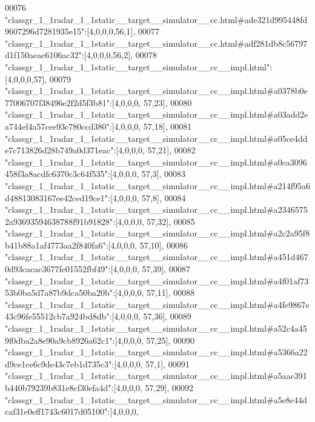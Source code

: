 \begin{DoxyCode}
00076 \textcolor{stringliteral}{"classgr\_1\_1radar\_1\_1static\_\_target\_\_simulator\_\_cc.html#ade321d995448fd9607296d7281935e15"}:[4,0,0,0,56,1],
00077 \textcolor{stringliteral}{"classgr\_1\_1radar\_1\_1static\_\_target\_\_simulator\_\_cc.html#adf281db8c56797d1f150aeae6106ac32"}:[4,0,0,0,56,2],
00078 \textcolor{stringliteral}{"classgr\_1\_1radar\_1\_1static\_\_target\_\_simulator\_\_cc\_\_impl.html"}:[4,0,0,0,57],
00079 \textcolor{stringliteral}{"classgr\_1\_1radar\_1\_1static\_\_target\_\_simulator\_\_cc\_\_impl.html#a0378b0e77006707f38496e2f2d5f3b81"}:[4,0,0,0,
      57,23],
00080 \textcolor{stringliteral}{"classgr\_1\_1radar\_1\_1static\_\_target\_\_simulator\_\_cc\_\_impl.html#a03add2ea744ef4a57cee93c780ccd380"}:[4,0,0,0,
      57,18],
00081 \textcolor{stringliteral}{"classgr\_1\_1radar\_1\_1static\_\_target\_\_simulator\_\_cc\_\_impl.html#a05ce4dde7c713826d28b749a0d371eac"}:[4,0,0,0,
      57,21],
00082 \textcolor{stringliteral}{"classgr\_1\_1radar\_1\_1static\_\_target\_\_simulator\_\_cc\_\_impl.html#a0ca3096458f3a8acdfc6370c3c64f535"}:[4,0,0,0,
      57,3],
00083 \textcolor{stringliteral}{"classgr\_1\_1radar\_1\_1static\_\_target\_\_simulator\_\_cc\_\_impl.html#a214f95a6d48813083167ee42ced19ce1"}:[4,0,0,0,
      57,8],
00084 \textcolor{stringliteral}{"classgr\_1\_1radar\_1\_1static\_\_target\_\_simulator\_\_cc\_\_impl.html#a23465752a93693594638788f91b91828"}:[4,0,0,0,
      57,32],
00085 \textcolor{stringliteral}{"classgr\_1\_1radar\_1\_1static\_\_target\_\_simulator\_\_cc\_\_impl.html#a2c2a95f8b41b88a1af4773aa2f840fa6"}:[4,0,0,0,
      57,10],
00086 \textcolor{stringliteral}{"classgr\_1\_1radar\_1\_1static\_\_target\_\_simulator\_\_cc\_\_impl.html#a451d4670d93cacac3677fe01552fbf49"}:[4,0,0,0,
      57,39],
00087 \textcolor{stringliteral}{"classgr\_1\_1radar\_1\_1static\_\_target\_\_simulator\_\_cc\_\_impl.html#a4f01af7353b0ba5d7a87b9dca50ba20b"}:[4,0,0,0,
      57,11],
00088 \textcolor{stringliteral}{"classgr\_1\_1radar\_1\_1static\_\_target\_\_simulator\_\_cc\_\_impl.html#a4fe9867e43c96fe55512cb7a924bd8db"}:[4,0,0,0,
      57,36],
00089 \textcolor{stringliteral}{"classgr\_1\_1radar\_1\_1static\_\_target\_\_simulator\_\_cc\_\_impl.html#a52c4a459f0dba2a8e90a9cb8926a62c1"}:[4,0,0,0,
      57,25],
00090 \textcolor{stringliteral}{"classgr\_1\_1radar\_1\_1static\_\_target\_\_simulator\_\_cc\_\_impl.html#a5366a22d9ce1ce6c9de43c7eb1d735c3"}:[4,0,0,0,
      57,1],
00091 \textcolor{stringliteral}{"classgr\_1\_1radar\_1\_1static\_\_target\_\_simulator\_\_cc\_\_impl.html#a5aac391b440b79239b831e8cf30efa4d"}:[4,0,0,0,
      57,29],
00092 \textcolor{stringliteral}{"classgr\_1\_1radar\_1\_1static\_\_target\_\_simulator\_\_cc\_\_impl.html#a5e8e44dcaf31e0eff1743c6017d05100"}:[4,0,0,0,

\end{DoxyCode}
